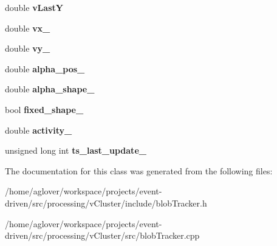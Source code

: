 \begin{DoxyCompactItemize}
\item 
double {\bfseries v\+LastY}\hypertarget{classBlobTracker_ae836b9dd8d830ba8f6ccb6ea2f80e313}{}\label{classBlobTracker_ae836b9dd8d830ba8f6ccb6ea2f80e313}

\item 
double {\bfseries vx\+\_\+}\hypertarget{classBlobTracker_a98a091e1f3a0e16a71ff6602079c9c23}{}\label{classBlobTracker_a98a091e1f3a0e16a71ff6602079c9c23}

\item 
double {\bfseries vy\+\_\+}\hypertarget{classBlobTracker_a5b41c1c66d14c8b794b314ba204a93bd}{}\label{classBlobTracker_a5b41c1c66d14c8b794b314ba204a93bd}

\item 
double {\bfseries alpha\+\_\+pos\+\_\+}\hypertarget{classBlobTracker_ae10a65c546bfa9ed53d341a46080f53f}{}\label{classBlobTracker_ae10a65c546bfa9ed53d341a46080f53f}

\item 
double {\bfseries alpha\+\_\+shape\+\_\+}\hypertarget{classBlobTracker_a5183d2c99bd9dbc6f7170050e5830dea}{}\label{classBlobTracker_a5183d2c99bd9dbc6f7170050e5830dea}

\item 
bool {\bfseries fixed\+\_\+shape\+\_\+}\hypertarget{classBlobTracker_a57841b67cf49324e2ff7b9698897e908}{}\label{classBlobTracker_a57841b67cf49324e2ff7b9698897e908}

\item 
double {\bfseries activity\+\_\+}\hypertarget{classBlobTracker_aaf83587414449f41fa7719f9939c48a8}{}\label{classBlobTracker_aaf83587414449f41fa7719f9939c48a8}

\item 
unsigned long int {\bfseries ts\+\_\+last\+\_\+update\+\_\+}\hypertarget{classBlobTracker_a4084fae015313204286ce98259856467}{}\label{classBlobTracker_a4084fae015313204286ce98259856467}

\end{DoxyCompactItemize}


The documentation for this class was generated from the following files\+:\begin{DoxyCompactItemize}
\item 
/home/aglover/workspace/projects/event-\/driven/src/processing/v\+Cluster/include/blob\+Tracker.\+h\item 
/home/aglover/workspace/projects/event-\/driven/src/processing/v\+Cluster/src/blob\+Tracker.\+cpp\end{DoxyCompactItemize}
